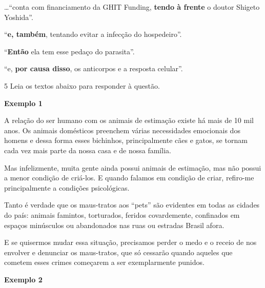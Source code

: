 \begin{escolha}

    \item \ldots ``conta com financiamento da GHIT Funding, \textbf{tendo à frente} o doutor Shigeto Yoshida''.

    \item ``\textbf{e, também}, tentando evitar a infecção do hospedeiro''.

    \item ``\textbf{Então} ela tem esse pedaço do parasita''.

    \item ``e, \textbf{por causa disso}, os anticorpos e a resposta celular''.

\end{escolha}

\num{5} Leia os textos abaixo para responder à questão. 

\begin{myquote}

\textbf{Exemplo 1}

A relação do ser humano com os animais de estimação existe há mais de 10
mil anos. Os animais domésticos preenchem várias necessidades emocionais
dos homens e dessa forma esses bichinhos, principalmente cães e gatos,
se tornam cada vez mais parte da nossa casa e de nossa família.

Mas infelizmente, muita gente ainda possui animais de estimação, mas não
possui a menor condição de criá-los. E quando falamos em condição de
criar, refiro-me principalmente a condições psicológicas.

Tanto é verdade que os maus-tratos aos ``pets'' são evidentes em todas as
cidades do país: animais famintos, torturados, feridos covardemente,
confinados em espaços minúsculos ou abandonados nas ruas ou estradas
Brasil afora.

E se quisermos mudar essa situação, precisamos perder o medo e o receio
de nos envolver e denunciar os maus-tratos, que só cessarão
quando aqueles que cometem esses crimes começarem a ser exemplarmente
punidos.

\end{myquote}


\textbf{Exemplo 2}

